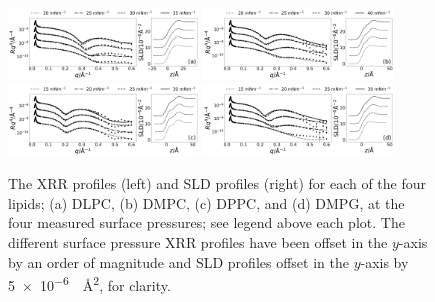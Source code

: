 \documentclass[amsmath,amssymb,twocolumn,superscriptaddress]{revtex4-1}
\begin{document}
%
\begin{figure}
    \centering
    \includegraphics[width=0.45\textwidth]{figures/dlpc_ref_sld}
    \includegraphics[width=0.45\textwidth]{figures/dmpc_ref_sld}
    \includegraphics[width=0.45\textwidth]{figures/dppc_ref_sld}
    \includegraphics[width=0.45\textwidth]{figures/dmpg_ref_sld}
    \caption{\small The XRR profiles (left) and SLD profiles (right) for each
  of the four lipids; (a) DLPC, (b) DMPC, (c) DPPC, and (d) DMPG, at the four
  measured surface pressures; see legend above each plot. The different
  surface pressure XRR profiles have been offset in the $y$-axis by an order
  of magnitude and SLD profiles offset in the $y$-axis by
  \SI{5e-6}{\per\square\angstrom}, for clarity.}
    \label{fig:lipids}
\end{figure}
%
\end{document}
